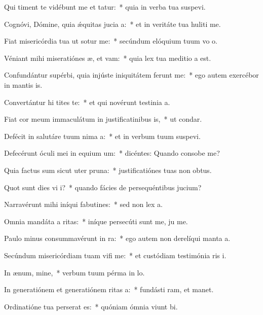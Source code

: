 \item Qui timent te vidébunt me et tatur:~* quia in verba tua suspevi.
\item Cognóvi, Dómine, quia ǽquitas jucia a:~* et in veritáte tua huliti me.
\item Fiat misericórdia tua ut sotur me:~* secúndum elóquium tuum vo o.
\item Véniant mihi miseratiónes æ, et vam:~* quia lex tua meditio a est.
\item Confundántur supérbi, quia injúste iniquitátem ferunt  me:~* ego autem exercébor in mantis is.
\item Convertántur hi tites te:~* et qui novérunt testinia a.
\item Fiat cor meum immaculátum in justificatinibus is,~* ut  condar.
\item Defécit in salutáre tuum nima a:~* et in verbum tuum suspevi.
\item Defecérunt óculi mei in equium um:~* dicéntes: Quando consobe me?
\item Quia factus sum sicut uter  pruna:~* justificatiónes tuas non  obtus.
\item Quot sunt dies vi i?~* quando fácies de persequéntibus  jucium?
\item Narravérunt mihi iníqui fabutines:~* sed non  lex a.
\item Omnia mandáta a ritas:~* iníque persecúti sunt me, ju me.
\item Paulo minus consummavérunt  in ra:~* ego autem non derelíqui manta a.
\item Secúndum misericórdiam tuam vifi me:~* et custódiam testimónia ris i.
\item In ænum, mine,~* verbum tuum pérma in lo.
\item In generatiónem et generatiónem ritas a:~* fundásti ram, et manet.
\item Ordinatióne tua perserat es:~* quóniam ómnia viunt bi.
